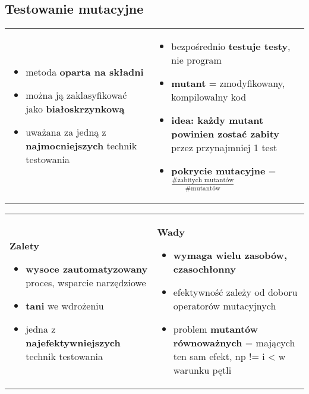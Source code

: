 \documentclass[../main.tex]{subfiles}
\begin{document}
    \subsection{Testowanie mutacyjne}
    \begin{table}[H]
        \begin{center}
            \begin{tabular}{p{8cm} p{8cm}}
                \begin{itemize}
                    \item metoda \textbf{oparta na składni}
                    \item można ją zaklasyfikować jako \textbf{białoskrzynkową}
                    \item uważana za jedną z \textbf{najmocniejszych} technik testowania
                \end{itemize}
                &
                \begin{itemize}
                    \item bezpośrednio \textbf{testuje testy}, nie program

                    \item \textbf{mutant} = zmodyfikowany, kompilowalny kod
                    \item \textbf{idea: każdy mutant powinien zostać zabity} przez
                    przynajmniej 1 test
                    \item \textbf{pokrycie mutacyjne} = $\frac{\# \text{zabitych mutantów}}{\# \text{mutantów}}$
                \end{itemize}
            \end{tabular}
        \end{center}
    \end{table}

    \begin{table}[H]
        \begin{center}
            \begin{tabular}{p{8cm} p{8cm}}
                \textbf{Zalety}
                \begin{itemize}
                    \item \textbf{wysoce zautomatyzowany} proces, wsparcie narzędziowe
                    \item \textbf{tani} we wdrożeniu
                    \item jedna z \textbf{najefektywniejszych} technik testowania
                \end{itemize}
                &
                \textbf{Wady}
                \begin{itemize}
                    \item \textbf{wymaga wielu zasobów, czasochłonny}
                    \item efektywność zależy od doboru operatorów mutacyjnych
                    \item problem \textbf{mutantów równoważnych} = mających ten sam efekt, np != i < w warunku pętli
                \end{itemize}
            \end{tabular}
        \end{center}
    \end{table}
\end{document}
